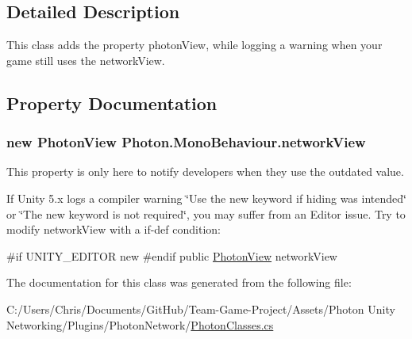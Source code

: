 \subsection{Detailed Description}
This class adds the property photon\+View, while logging a warning when your game still uses the network\+View. 



\subsection{Property Documentation}
\subsubsection[{\texorpdfstring{network\+View}{networkView}}]{\setlength{\rightskip}{0pt plus 5cm}new {\bf Photon\+View} Photon.\+Mono\+Behaviour.\+network\+View\hspace{0.3cm}{\ttfamily [get]}}\hypertarget{class_photon_1_1_mono_behaviour_a00c97185c3a8594bf5c1c518a701706e}{}\label{class_photon_1_1_mono_behaviour_a00c97185c3a8594bf5c1c518a701706e}


This property is only here to notify developers when they use the outdated value. 

If Unity 5.\+x logs a compiler warning \char`\"{}\+Use the new keyword if hiding was intended\char`\"{} or \char`\"{}\+The new keyword is not required\char`\"{}, you may suffer from an Editor issue. Try to modify network\+View with a if-\/def condition\+:

\#if U\+N\+I\+T\+Y\+\_\+\+E\+D\+I\+T\+OR new \#endif public \hyperlink{class_photon_view}{Photon\+View} network\+View 

The documentation for this class was generated from the following file\+:\begin{DoxyCompactItemize}
\item 
C\+:/\+Users/\+Chris/\+Documents/\+Git\+Hub/\+Team-\/\+Game-\/\+Project/\+Assets/\+Photon Unity Networking/\+Plugins/\+Photon\+Network/\hyperlink{_photon_classes_8cs}{Photon\+Classes.\+cs}\end{DoxyCompactItemize}
